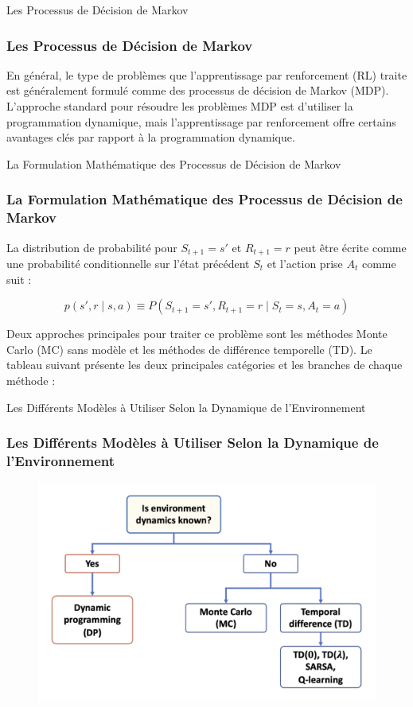 \documentclass[serif, aspectratio=169]{beamer}
\begin{document}
\begin{frame}{Les Processus de Décision de Markov}
	\frametitle<presentation>{Les Processus de Décision de Markov}
	
	En général, le type de problèmes que l'apprentissage par renforcement (RL) traite est généralement formulé comme des processus de décision de Markov (MDP). L'approche standard pour résoudre les problèmes MDP est d'utiliser la programmation dynamique, mais l'apprentissage par renforcement offre certains avantages clés par rapport à la programmation dynamique. 
	
\end{frame}

\begin{frame}{La Formulation Mathématique des Processus de Décision de Markov}
	\frametitle{La Formulation Mathématique des Processus de Décision de Markov}
	
	La distribution de probabilité pour \( S_{t+1} = s' \) et \( R_{t+1} = r \) peut être écrite comme une probabilité conditionnelle sur l'état précédent \( S_t \) et l'action prise \( A_t \) comme suit :
	
	\[
	p(s', r \mid s, a) \equiv P(S_{t+1} = s', R_{t+1} = r \mid S_t = s, A_t = a)
	\]
	
	\vspace{20pt}
	
	Deux approches principales pour traiter ce problème sont les méthodes Monte Carlo (MC) sans modèle et les méthodes de différence temporelle (TD). Le tableau suivant présente les deux principales catégories et les branches de chaque méthode :
	
\end{frame}

\begin{frame}{Les Différents Modèles à Utiliser Selon la Dynamique de l'Environnement}
	\frametitle{Les Différents Modèles à Utiliser Selon la Dynamique de l'Environnement}
	
	\begin{figure}[htpb]
		\centering
		\includegraphics[keepaspectratio, scale=0.8]{images/markov.png}
	\end{figure}
	
\end{frame}
\end{document}
